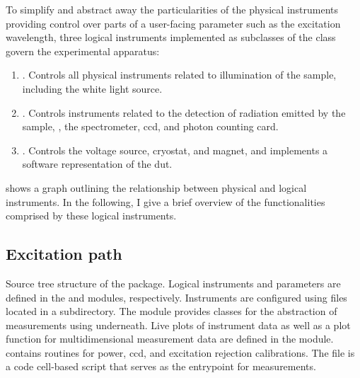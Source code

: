 To simplify and abstract away the particularities of the physical instruments providing control over parts of a user-facing parameter such as the excitation wavelength,
three logical instruments implemented as subclasses of the \qcodes {} class govern the experimental apparatus:
\begin{enumerate}\label{enm:logical_instruments}
    \item \label{itm:logical_instruments:exc}
        .
        Controls all physical instruments related to illumination of the sample, including the white light source.
    \item \label{itm:logical_instruments:det}
        .
        Controls instruments related to the detection of radiation emitted by the sample, \ie, the spectrometer, \gls{ccd}, and photon counting card.
    \item \label{itm:logical_instruments:sam}
        .
        Controls the \qdac voltage source, cryostat, and magnet, and implements a software representation of the \gls{dut}.
\end{enumerate}
 shows a graph outlining the relationship between physical and logical instruments.
In the following, I give a brief overview of the functionalities comprised by these logical instruments.

\subsection{Excitation path}\label{subsec:exp:mjolnir:logical_instruments:exc}
\begin{marginfigure}
    
    \caption[]{
        Source tree structure of the \mjolnir package.
        Logical \qcodes instruments and parameters are defined in the  and  modules, respectively.
        Instruments are configured using  files located in a  subdirectory.
        The  module provides classes for the abstraction of measurements using \qcodes underneath.
        Live plots of instrument data as well as a plot function for multidimensional measurement data are defined in the  module.
         contains routines for power, \acrshort{ccd}, and excitation rejection calibrations.
        The  file is a code cell-based script that serves as the entrypoint for measurements.
    }
    \label{fig:exp:mjolnir:tree}
\end{marginfigure}

